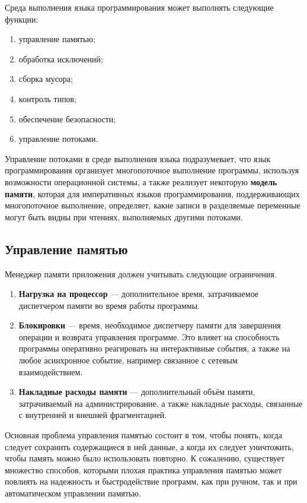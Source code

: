 Среда выполнения языка программирования может выполнять следующие функции:~\cite{dotnet_clr}

\begin{enumerate}[label*=\arabic*)]
	\item управление памятью;
	\item обработка исключений; 
	\item сборка мусора; 
	\item контроль типов;
	\item обеспечение безопасности; 
	\item управление потоками. 
\end{enumerate}

Управление потоками в среде выполнения языка подразумевает, что язык программирования организует многопоточное выполнение программы, используя возможности операционной системы, а также реализует некоторую \textbf{модель памяти}, которая для императивных языков программирования, поддерживающих многопоточное выполнение, определяет, какие записи в разделяемые переменные могут быть видны при чтениях, выполняемых другими потоками.~\cite{memory_model}

\subsection{Управление памятью}

Менеджер памяти приложения должен учитывать следующие ограничения.~\cite{mm_overview}

\begin{enumerate}[label*=\arabic*.]
	\item \textbf{Нагрузка на процессор} --- дополнительное время, затрачиваемое диспетчером памяти во время работы программы.
	\item \textbf{Блокировки} --- время, необходимое диспетчеру памяти для завершения операции и возврата управления программе. Это влияет на способность программы оперативно реагировать на интерактивные события, а также на любое асинхронное событие, например связанное с сетевым взаимодействием.
	\item \textbf{Накладные расходы памяти} --- дополнительный объём памяти, затрачиваемый на администрирование, а также накладные расходы, связанные с внутренней и внешней фрагментацией.
\end{enumerate}

Основная проблема управления памятью состоит в том, чтобы понять, когда следует сохранить содержащиеся в ней данные, а когда их следует уничтожить, чтобы память можно было использовать повторно. К сожалению, существует множество способов, которыми плохая практика управления памятью может повлиять на надежность и быстродействие программ, как при ручном, так и при автоматическом управлении памятью.

